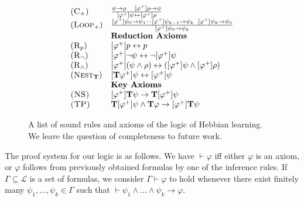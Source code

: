 \documentclass[letterpaper]{article}
\theoremstyle{definition}
\newcommand{\proves}{\vdash}
\newcommand{\lang}{\mathcal{L}}
\newcommand{\Typ}{\textrm{\textup{\textbf{T}}}}
\newcommand{\axiom}{\textsc}
\begin{document}
\begin{figure}[ht!]
\begin{equation*}
{\begin{array}{ll}
    (\axiom{C}_+) & \frac{\psi \to \rho \quad [\varphi^+] \rho \to \psi}{[\varphi^+] \psi \leftrightarrow [\varphi^+] \rho} \\
    
    (\axiom{Loop}_+) & \frac{[\varphi^+] \psi_0 \to \psi_1 
    \cdots 
    [\varphi^+] \psi_{k-1} \to \psi_k \enskip 
    [\varphi^+] \psi_k \to \psi_0}
    {[\varphi^+] \psi_0 \to \psi_k} \\
    
    & \textbf{Reduction Axioms}\\

    (\axiom{R}_p) & [\varphi^+] p \leftrightarrow p \\
    
    (\axiom{R}_\neg) & [\varphi^+] \neg \psi \leftrightarrow \neg [\varphi^+] \psi \\
    
    (\axiom{R}_\land) & [\varphi^+] (\psi \land \rho) \leftrightarrow ([\varphi^+] \psi \land [\varphi^+] \rho)\\
    
    (\axiom{Nest}_\Typ) & [\Typ \varphi^+] \psi \leftrightarrow [\varphi^+] \psi \\
    
    & \textbf{Key Axioms}\\

    \axiom{(NS)} & [\varphi^+] \Typ \psi \to \Typ [\varphi^+] \psi\\
    
    \axiom{(TP)} & \Typ [\varphi^+] \psi \land \Typ \varphi \to [\varphi^+] \Typ \psi\\
\end{array}
}
\end{equation*}
\caption{A list of sound rules and axioms of the logic of Hebbian learning.  We leave the question of completeness to future work.}
\label{fig:proof-system}
\end{figure}

The proof system for our logic is as follows.  We have $\proves \varphi$ iff either $\varphi$ is an axiom, or $\varphi$ follows from previously obtained formulas by one of the inference rules.  If $\Gamma \subseteq \lang$ is a set of formulas, we consider $\Gamma \proves \varphi$ to hold whenever there exist finitely many $\psi_1, \ldots, \psi_k \in \Gamma$ such that $\proves \psi_1 \land \ldots \land \psi_k \to \varphi$.
\end{document}
